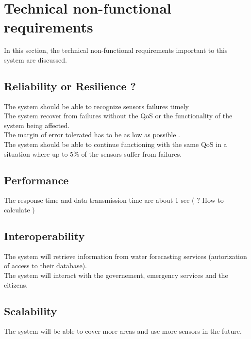 \section{Technical non-functional requirements}
In this section, the technical non-functional requirements important to this system are discussed.

\subsection{Reliability or Resilience ? }

The system should be able to recognize sensors failures timely \\
The system recover from failures without the QoS or the functionality of the system being affected. \\
The margin of error tolerated has to be as low as possible .\\
The system should be able to continue functioning with the same QoS in a situation where up to 5\% of the sensors suffer from failures. \\ %

\subsection{Performance}
The response time and data transmission time are about 1 sec ( ? How to calculate ) \\


\subsection{Interoperability}
The system will retrieve information from water forecasting services (autorization of access to their database).\\ 
The system will interact with the governement, emergency services and the citizens.\\



\subsection{Scalability}
The system will be able to cover more areas and use more sensors in the future.

